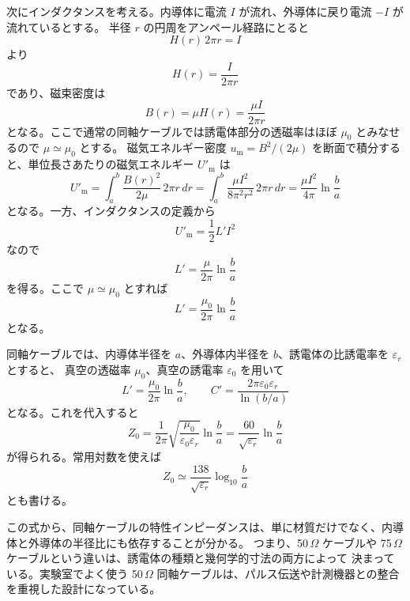 \documentclass[uplatex,dvipdfmx,12pt,nomag]{jsarticle}
\begin{document}
次にインダクタンスを考える。内導体に電流 $I$ が流れ、外導体に戻り電流 $-I$ が流れているとする。
半径 $r$ の円周をアンペール経路にとると
\begin{equation}
  H(r)\,2\pi r = I
\end{equation}
より
\begin{equation}
  H(r)=\frac{I}{2\pi r}
\end{equation}
であり、磁束密度は
\begin{equation}
  B(r)=\mu H(r)=\frac{\mu I}{2\pi r}
\end{equation}
となる。ここで通常の同軸ケーブルでは誘電体部分の透磁率はほぼ $\mu_0$ とみなせるので $\mu\simeq\mu_0$ とする。
磁気エネルギー密度 $u_{\mathrm m}=B^2/(2\mu)$ を断面で積分すると、単位長さあたりの磁気エネルギー $U'_{\mathrm m}$ は
\begin{equation}
  U'_{\mathrm m}
  = \int_a^b \frac{B(r)^2}{2\mu}\, 2\pi r\,dr
  = \int_a^b \frac{\mu I^2}{8\pi^2 r^2}\,2\pi r\,dr
  = \frac{\mu I^2}{4\pi}\ln\frac{b}{a}
\end{equation}
となる。一方、インダクタンスの定義から
\begin{equation}
  U'_{\mathrm m}=\frac{1}{2}L'I^2
\end{equation}
なので
\begin{equation}
  L'=\frac{\mu}{2\pi}\ln\frac{b}{a}
\end{equation}
を得る。ここで $\mu\simeq\mu_0$ とすれば
\begin{equation}
  L' = \frac{\mu_0}{2\pi}\ln\frac{b}{a}
\end{equation}
となる。

同軸ケーブルでは、内導体半径を $a$、外導体内半径を $b$、誘電体の比誘電率を $\varepsilon_r$ とすると、
真空の透磁率 $\mu_0$、真空の誘電率 $\varepsilon_0$ を用いて
\begin{equation}
  L' = \frac{\mu_0}{2\pi}\ln\frac{b}{a},
  \qquad
  C' = \frac{2\pi\varepsilon_0\varepsilon_r}{\ln(b/a)}
\end{equation}
となる。これを代入すると
\begin{equation}
  Z_0
  =
  \frac{1}{2\pi}\sqrt{\frac{\mu_0}{\varepsilon_0\varepsilon_r}}
  \ln\frac{b}{a}
  =
  \frac{60}{\sqrt{\varepsilon_r}}\ln\frac{b}{a}
\end{equation}
が得られる。常用対数を使えば
\begin{equation}
  Z_0 \simeq \frac{138}{\sqrt{\varepsilon_r}}\log_{10}\frac{b}{a}
\end{equation}
とも書ける。

この式から、同軸ケーブルの特性インピーダンスは、単に材質だけでなく、内導体と外導体の半径比にも依存することが分かる。
つまり、50\,$\Omega$ ケーブルや 75\,$\Omega$ ケーブルという違いは、誘電体の種類と幾何学的寸法の両方によって
決まっている。実験室でよく使う 50\,$\Omega$ 同軸ケーブルは、パルス伝送や計測機器との整合を重視した設計になっている。
\end{document}

